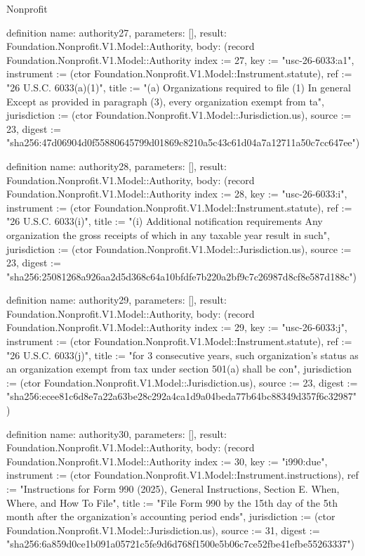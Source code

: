 \begin{lexlean}{Nonprofit}
\begin{semanticmodule}
definition{
  name: authority27,
  parameters: [],
  result: Foundation.Nonprofit.V1.Model::Authority,
  body: (record Foundation.Nonprofit.V1.Model::Authority {index := 27, key := "usc-26-6033:a1", instrument := (ctor Foundation.Nonprofit.V1.Model::Instrument.statute), ref := "26 U.S.C. 6033(a)(1)", title := "(a) Organizations required to file (1) In general Except as provided in paragraph (3), every organization exempt from ta", jurisdiction := (ctor Foundation.Nonprofit.V1.Model::Jurisdiction.us), source := 23, digest := "sha256:47d06904d0f55880645799d01869c8210a5c43c61d04a7a12711a50c7cc647ee"})
}

definition{
  name: authority28,
  parameters: [],
  result: Foundation.Nonprofit.V1.Model::Authority,
  body: (record Foundation.Nonprofit.V1.Model::Authority {index := 28, key := "usc-26-6033:i", instrument := (ctor Foundation.Nonprofit.V1.Model::Instrument.statute), ref := "26 U.S.C. 6033(i)", title := "(i) Additional notification requirements Any organization the gross receipts of which in any taxable year result in such", jurisdiction := (ctor Foundation.Nonprofit.V1.Model::Jurisdiction.us), source := 23, digest := "sha256:25081268a926aa2d5d368c64a10bfdfe7b220a2bf9c7c26987d8cf8e587d188c"})
}

definition{
  name: authority29,
  parameters: [],
  result: Foundation.Nonprofit.V1.Model::Authority,
  body: (record Foundation.Nonprofit.V1.Model::Authority {index := 29, key := "usc-26-6033:j", instrument := (ctor Foundation.Nonprofit.V1.Model::Instrument.statute), ref := "26 U.S.C. 6033(j)", title := "for 3 consecutive years, such organization's status as an organization exempt from tax under section 501(a) shall be con", jurisdiction := (ctor Foundation.Nonprofit.V1.Model::Jurisdiction.us), source := 23, digest := "sha256:ecee81c6d8e7a22a63be28c292a4ca1d9a04beda77b64bc88349d357f6c32987"})
}

definition{
  name: authority30,
  parameters: [],
  result: Foundation.Nonprofit.V1.Model::Authority,
  body: (record Foundation.Nonprofit.V1.Model::Authority {index := 30, key := "i990:due", instrument := (ctor Foundation.Nonprofit.V1.Model::Instrument.instructions), ref := "Instructions for Form 990 (2025), General Instructions, Section E. When, Where, and How To File", title := "File Form 990 by the 15th day of the 5th month after the organization’s accounting period ends", jurisdiction := (ctor Foundation.Nonprofit.V1.Model::Jurisdiction.us), source := 31, digest := "sha256:6a859d0ce1b091a05721c5fe9d6d768f1500e5b06c7ce52fbe41efbe55263337"})
}


\end{semanticmodule}
\end{lexlean}
